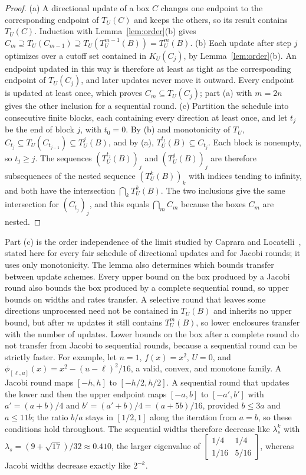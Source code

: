 \begin{proof}
(a) A directional update of a box $C$ changes one endpoint to the
corresponding endpoint of $T_U(C)$ and keeps the others, so its result
contains $T_U(C)$. Induction with Lemma~\ref{lem:order}(b) gives
$C_{m}\supseteq T_U(C_{m-1})\supseteq T_U(T_U^{m-1}(B))=T_U^m(B)$.
(b) Each update after step $j$ optimizes over a cutoff set contained in
$K_U(C_j)$, by Lemma~\ref{lem:order}(b). An endpoint updated in this way
is therefore at least as tight as the corresponding endpoint of
$T_U(C_j)$, and later updates never move it outward. Every endpoint is
updated at least once, which proves $C_m\subseteq T_U(C_j)$; part (a) with
$m=2n$ gives the other inclusion for a sequential round. (c) Partition the
schedule into consecutive finite blocks, each containing every direction
at least once, and let $t_j$ be the end of block $j$, with $t_0=0$. By (b)
and monotonicity of $T_U$, $C_{t_j}\subseteq T_U(C_{t_{j-1}})\subseteq
T_U^j(B)$, and by (a), $T_U^{t_j}(B)\subseteq C_{t_j}$. Each block is
nonempty, so $t_j\ge j$. The sequences $(T_U^{t_j}(B))_j$ and $(T_U^j(B))_j$
are therefore subsequences of the nested sequence $(T_U^k(B))_k$ with
indices tending to infinity, and both have the intersection
$\bigcap_kT_U^k(B)$. The two inclusions give the same intersection for
$(C_{t_j})_j$, and this equals $\bigcap_mC_m$ because the boxes $C_m$ are
nested.
\end{proof}

Part (c) is the order independence of the limit studied by Caprara and
Locatelli~\cite{caprara2010-global-optimization-problems-and-domain},
stated here for every fair schedule of directional updates and for Jacobi
rounds; it uses only monotonicity. The lemma also determines which bounds transfer between
update schemes. Every upper bound on the box produced by a Jacobi round
also bounds the box produced by a complete sequential round, so upper
bounds on widths and rates transfer. A selective round that leaves some
directions unprocessed need not be contained in $T_U(B)$ and inherits no
upper bound, but after $m$ updates it still contains $T_U^m(B)$, so lower
enclosures transfer with the number of updates. Lower bounds on the box
after a complete round do not transfer from Jacobi to sequential rounds,
because a sequential round can be strictly faster. For example, let $n=1$,
$f(x)=x^2$, $U=0$, and $\phi_{[\ell,u]}(x)=x^2-(u-\ell)^2/16$, a valid,
convex, and monotone family. A Jacobi round maps $[-h,h]$ to $[-h/2,h/2]$.
A sequential round that updates the lower and then the upper endpoint maps
$[-a,b]$ to $[-a',b']$ with $a'=(a+b)/4$ and $b'=(a'+b)/4=(a+5b)/16$,
provided $b\le3a$ and $a\le11b$; the ratio $b/a$ stays in $[1/2,1]$ along
the iteration from $a=b$, so these conditions hold throughout. The
sequential widths therefore decrease like $\lambda_s^k$ with
$\lambda_s=(9+\sqrt{17})/32\approx0.410$, the larger eigenvalue of
$\left[\begin{smallmatrix}1/4&1/4\\1/16&5/16\end{smallmatrix}\right]$,
whereas Jacobi widths decrease exactly like $2^{-k}$.

